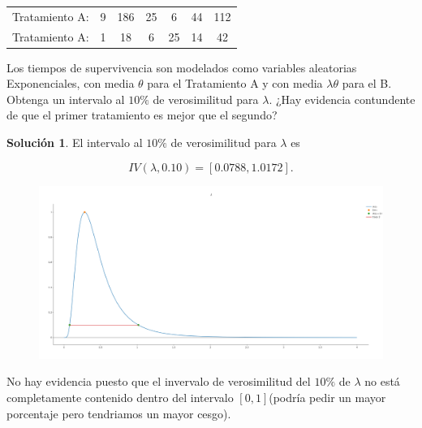 \documentclass[letterpaper]{article}
\theoremstyle{definition}
\theoremstyle{lemathm}
\theoremstyle{lemathm}
\newtheorem{sol}{Solución}
\theoremstyle{lemathm}
\theoremstyle{lemademthm}
\newcommand{\1}{\mathbbm{1}}
\begin{document}
\begin{enumerate}
		\begin{center}
			\begin{tabular}{ccccccc}
				Tratamiento A: & 9 & 186 & 25 & 6 & 44 & 112\\
				Tratamiento A: & 1 & 18 & 6 & 25 & 14 & 42
			\end{tabular}
		\end{center}
		
		Los tiempos de supervivencia son modelados como variables aleatorias Exponenciales, con media $\theta$ para el Tratamiento A y con media $\lambda\theta$ para el B. Obtenga un intervalo al $10\%$ de verosimilitud para $\lambda$. ¿Hay evidencia contundente de que el primer tratamiento es mejor que el segundo?

		\begin{sol}
			El intervalo al $10\%$ de verosimilitud para $\lambda$ es

			\[IV(\lambda, 0.10) = [0.0788,1.0172].\]

			\begin{figure}[H]
				\begin{center}
					\includegraphics[scale=0.105]{Images/Int_ver.png}
				\end{center}
			\end{figure}

			No hay evidencia puesto que el invervalo de verosimilitud del $10\%$ de $\lambda$ no está completamente contenido dentro del intervalo $[0,1]$(podría pedir un mayor porcentaje pero tendriamos un mayor cesgo).
		\end{sol}
	\end{enumerate}
\end{document}
